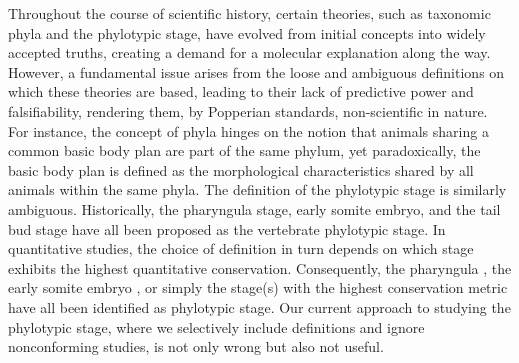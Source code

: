 Throughout the course of scientific history, certain theories, such as taxonomic phyla and the phylotypic stage, have evolved from initial concepts into widely accepted truths, creating a demand for a molecular explanation along the way. However, a fundamental issue arises from the loose and ambiguous definitions on which these theories are based, leading to their lack of predictive power and falsifiability, rendering them, by Popperian standards, non-scientific in nature. For instance, the concept of phyla hinges on the notion that animals sharing a common basic body plan are part of the same phylum, yet paradoxically, the basic body plan is defined as the morphological characteristics shared by all animals within the same phyla\cite{BUDD2000}. The definition of the phylotypic stage is similarly ambiguous. Historically, the pharyngula stage\cite{BALLARD1981}, early somite embryo\cite{Alberch1993}, and the tail bud stage \cite{Slack1993} have all been proposed as the vertebrate phylotypic stage. In quantitative studies, the choice of definition in turn depends on which stage exhibits the highest quantitative conservation. Consequently, the pharyngula \cite{Irie2011,marletaz2018}, the early somite embryo \cite{DomazetLoso2010}, or simply the stage(s) with the highest conservation metric\cite{Kalinka2010,Cordero2020} have all been identified as phylotypic stage. Our current approach to studying the phylotypic stage, where we selectively include definitions and ignore nonconforming studies, is not only wrong but also not useful.






